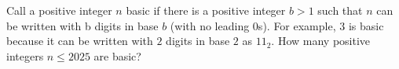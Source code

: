 Call a positive integer $n$ basic if there is a positive integer $b > 1$ such that $n$ can be written with b digits in base $b$ (with no leading $0$s). For example, $3$ is basic because it can be written with $2$ digits in base $2$ as $11_2$. How many positive integers $n \le 2025$ are basic?
